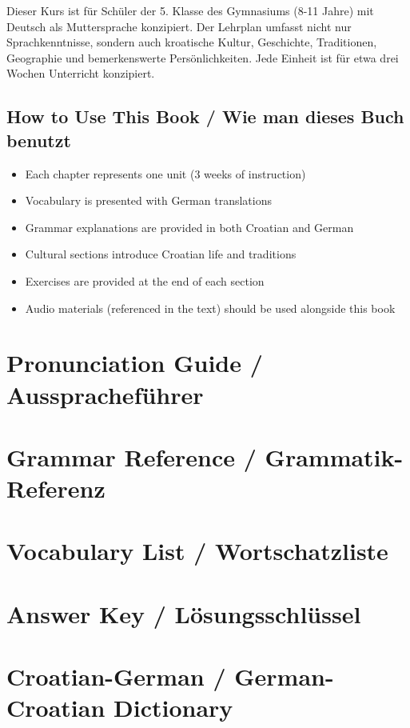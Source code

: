 \documentclass[11pt,a4paper,twoside]{book}
\begin{document}
Dieser Kurs ist für Schüler der 5. Klasse des Gymnasiums (8-11 Jahre) mit Deutsch als Muttersprache konzipiert. Der Lehrplan umfasst nicht nur Sprachkenntnisse, sondern auch kroatische Kultur, Geschichte, Traditionen, Geographie und bemerkenswerte Persönlichkeiten. Jede Einheit ist für etwa drei Wochen Unterricht konzipiert.

\section*{How to Use This Book / Wie man dieses Buch benutzt}
\begin{itemize}
    \item Each chapter represents one unit (3 weeks of instruction)
    \item Vocabulary is presented with German translations
    \item Grammar explanations are provided in both Croatian and German
    \item Cultural sections introduce Croatian life and traditions
    \item Exercises are provided at the end of each section
    \item Audio materials (referenced in the text) should be used alongside this book
\end{itemize}

\clearpage














\appendix
\chapter{Pronunciation Guide / Ausspracheführer}


\chapter{Grammar Reference / Grammatik-Referenz}


\chapter{Vocabulary List / Wortschatzliste}


\chapter{Answer Key / Lösungsschlüssel}


\chapter{Croatian-German / German-Croatian Dictionary}

\end{document}
